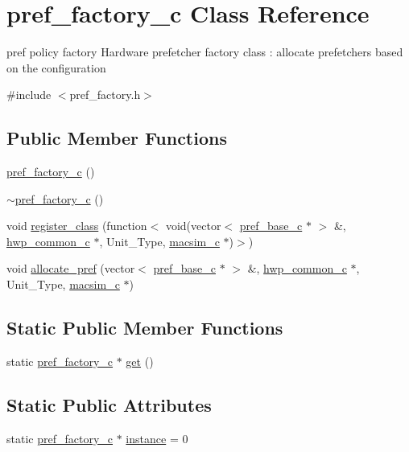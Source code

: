 \hypertarget{classpref__factory__c}{
\section{pref\_\-factory\_\-c Class Reference}
\label{classpref__factory__c}
}


pref policy factory Hardware prefetcher factory class : allocate prefetchers based on the configuration  




{\ttfamily \#include $<$pref\_\-factory.h$>$}

\subsection*{Public Member Functions}
\begin{DoxyCompactItemize}
\item 
\hyperlink{classpref__factory__c_a63f9a6dc8a6e7a2ebe3d73a47aa4aec2}{pref\_\-factory\_\-c} ()
\item 
\hyperlink{classpref__factory__c_a0a361d32320dfca170d738e8f4db0fd5}{$\sim$pref\_\-factory\_\-c} ()
\item 
void \hyperlink{classpref__factory__c_a7be154a97910948c1bb5fba5320940ba}{register\_\-class} (function$<$ void(vector$<$ \hyperlink{classpref__base__c}{pref\_\-base\_\-c} $\ast$ $>$ \&, \hyperlink{classhwp__common__c}{hwp\_\-common\_\-c} $\ast$, Unit\_\-Type, \hyperlink{classmacsim__c}{macsim\_\-c} $\ast$)$>$)
\item 
void \hyperlink{classpref__factory__c_aafb1c0a0160526b23c8e17285f76ce57}{allocate\_\-pref} (vector$<$ \hyperlink{classpref__base__c}{pref\_\-base\_\-c} $\ast$ $>$ \&, \hyperlink{classhwp__common__c}{hwp\_\-common\_\-c} $\ast$, Unit\_\-Type, \hyperlink{classmacsim__c}{macsim\_\-c} $\ast$)
\end{DoxyCompactItemize}
\subsection*{Static Public Member Functions}
\begin{DoxyCompactItemize}
\item 
static \hyperlink{classpref__factory__c}{pref\_\-factory\_\-c} $\ast$ \hyperlink{classpref__factory__c_a0aa0e3bd69c625e9b1ce80a7210b1b7a}{get} ()
\end{DoxyCompactItemize}
\subsection*{Static Public Attributes}
\begin{DoxyCompactItemize}
\item 
static \hyperlink{classpref__factory__c}{pref\_\-factory\_\-c} $\ast$ \hyperlink{classpref__factory__c_a8d68a36f77d53450d4dabb477f99faf5}{instance} = 0
\end{DoxyCompactItemize}
